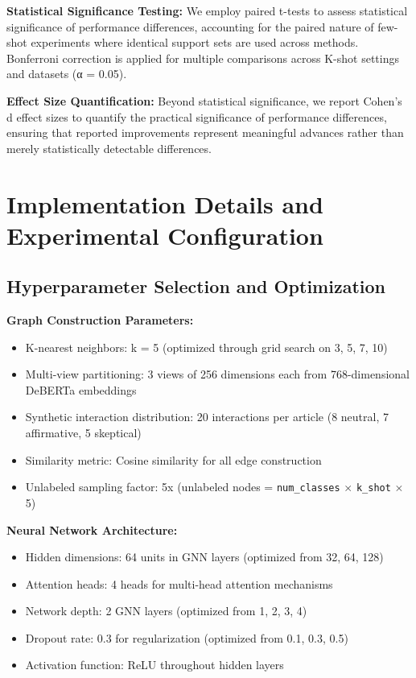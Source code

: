 \textbf{Statistical Significance Testing:} We employ paired t-tests to assess statistical significance of performance differences, accounting for the paired nature of few-shot experiments where identical support sets are used across methods. Bonferroni correction is applied for multiple comparisons across K-shot settings and datasets (α = 0.05).

\textbf{Effect Size Quantification:} Beyond statistical significance, we report Cohen's d effect sizes to quantify the practical significance of performance differences, ensuring that reported improvements represent meaningful advances rather than merely statistically detectable differences.

\section{Implementation Details and Experimental Configuration}

\subsection{Hyperparameter Selection and Optimization}

\textbf{Graph Construction Parameters:}
\begin{itemize}
\item K-nearest neighbors: k = 5 (optimized through grid search on {3, 5, 7, 10})
\item Multi-view partitioning: 3 views of 256 dimensions each from 768-dimensional DeBERTa embeddings
\item Synthetic interaction distribution: 20 interactions per article (8 neutral, 7 affirmative, 5 skeptical)
\item Similarity metric: Cosine similarity for all edge construction
\item Unlabeled sampling factor: 5x (unlabeled nodes = \texttt{num\_classes} $\times$ \texttt{k\_shot} $\times$ 5)
\end{itemize}

\textbf{Neural Network Architecture:}
\begin{itemize}
\item Hidden dimensions: 64 units in GNN layers (optimized from {32, 64, 128})
\item Attention heads: 4 heads for multi-head attention mechanisms
\item Network depth: 2 GNN layers (optimized from {1, 2, 3, 4})
\item Dropout rate: 0.3 for regularization (optimized from {0.1, 0.3, 0.5})
\item Activation function: ReLU throughout hidden layers
\end{itemize}


